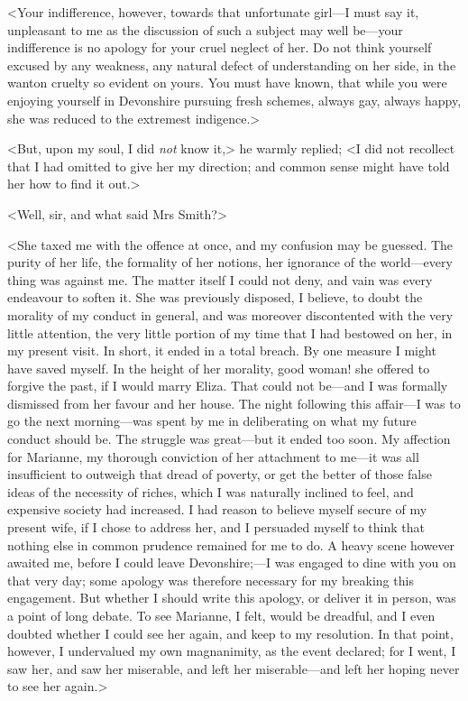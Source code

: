 <Your indifference, however, towards that unfortunate girl—I must say it, unpleasant to me as the discussion of such a subject may well be—your indifference is no apology for your cruel neglect of her. Do not think yourself excused by any weakness, any natural defect of understanding on her side, in the wanton cruelty so evident on yours. You must have known, that while you were enjoying yourself in Devonshire pursuing fresh schemes, always gay, always happy, she was reduced to the extremest indigence.>

<But, upon my soul, I did \textit{not} know it,> he warmly replied; <I did not recollect that I had omitted to give her my direction; and common sense might have told her how to find it out.>

<Well, sir, and what said Mrs Smith?>

<She taxed me with the offence at once, and my confusion may be guessed. The purity of her life, the formality of her notions, her ignorance of the world—every thing was against me. The matter itself I could not deny, and vain was every endeavour to soften it. She was previously disposed, I believe, to doubt the morality of my conduct in general, and was moreover discontented with the very little attention, the very little portion of my time that I had bestowed on her, in my present visit. In short, it ended in a total breach. By one measure I might have saved myself. In the height of her morality, good woman! she offered to forgive the past, if I would marry Eliza. That could not be—and I was formally dismissed from her favour and her house. The night following this affair—I was to go the next morning—was spent by me in deliberating on what my future conduct should be. The struggle was great—but it ended too soon. My affection for Marianne, my thorough conviction of her attachment to me—it was all insufficient to outweigh that dread of poverty, or get the better of those false ideas of the necessity of riches, which I was naturally inclined to feel, and expensive society had increased. I had reason to believe myself secure of my present wife, if I chose to address her, and I persuaded myself to think that nothing else in common prudence remained for me to do. A heavy scene however awaited me, before I could leave Devonshire;—I was engaged to dine with you on that very day; some apology was therefore necessary for my breaking this engagement. But whether I should write this apology, or deliver it in person, was a point of long debate. To see Marianne, I felt, would be dreadful, and I even doubted whether I could see her again, and keep to my resolution. In that point, however, I undervalued my own magnanimity, as the event declared; for I went, I saw her, and saw her miserable, and left her miserable—and left her hoping never to see her again.>

